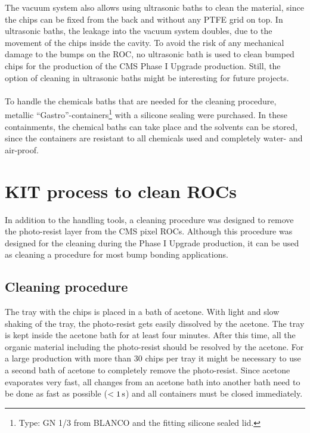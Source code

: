 The vacuum system also allows using ultrasonic baths to clean the material, since the chips can be fixed from the back and without any \ac{PTFE} grid on top. In ultrasonic baths, the leakage into the vacuum system doubles, due to the movement of the chips inside the cavity. To avoid the risk of any mechanical damage to the bumps on the \acs{ROC}, no ultrasonic bath is used to clean bumped chips for the production of the \ac{CMS} Phase I Upgrade production. Still, the option of cleaning in ultrasonic baths might be interesting for future projects.
\\
\\To handle the chemicals baths that are needed for the cleaning procedure, metallic ``Gastro''-containers\footnote{Type: GN 1/3 from BLANCO and the fitting silicone sealed lid.} with a silicone sealing were purchased. In these containments, the chemical baths can take place and the solvents can be stored, since the containers are resistant to all chemicals used and completely water- and air-proof.


\section{\acs{KIT} process to clean \acl{ROC}s}
In addition to the handling tools, a cleaning procedure was designed to remove the photo-resist layer from the \ac{CMS} pixel \acs{ROC}s. Although this procedure was designed for the cleaning during the Phase I Upgrade production, it can be used as cleaning a procedure for most bump bonding applications.%

\subsection{Cleaning procedure}
The tray with the chips is placed in a bath of acetone. With light and slow shaking of the tray, the photo-resist gets easily dissolved by the acetone. The tray is kept inside the acetone bath for at least four minutes. After this time, all the organic material including the photo-resist should be resolved by the acetone. For a large production with more than $30$ chips per tray it might be necessary to use a second bath of acetone to completely remove the photo-resist. Since acetone evaporates very fast, all changes from an acetone bath into another bath need to be done as fast as possible ($<1\,\rm{s}$) and all containers must be closed immediately.

